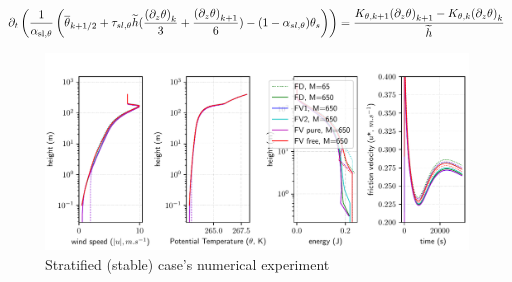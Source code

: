 \begin{equation}
	\label{eq:ND_StratifiedCase_semiDiscreteEkmanEqPTFVfree}
	\partial_t \left(\frac{1}{\alpha_{\rm sl, \theta}}
	\left(
	\overline{\theta}_{k+1/2} + \tau_{sl, \theta}
	\widetilde{h}(\frac{{(\partial_z \theta)}_k}{3} +
	\frac{{(\partial_z \theta)}_{k+1}}{6})
	 - (1 - \alpha_{sl, \theta})\theta_s
	\right) \right)
	= \frac{K_{\theta, k+1}{(\partial_z \theta)}_{k+1} -
	K_{\theta,k} {(\partial_z \theta)}_k}{\widetilde{h}}
\end{equation}

\begin{figure}
	\centering
	\includegraphics[scale=0.55]{images/consistency_comparisonStratified.pdf}
	\caption{Stratified (stable) case's numerical experiment}
	\label{fig:ND_StratifiedCase_NumericalExp}
\end{figure}
